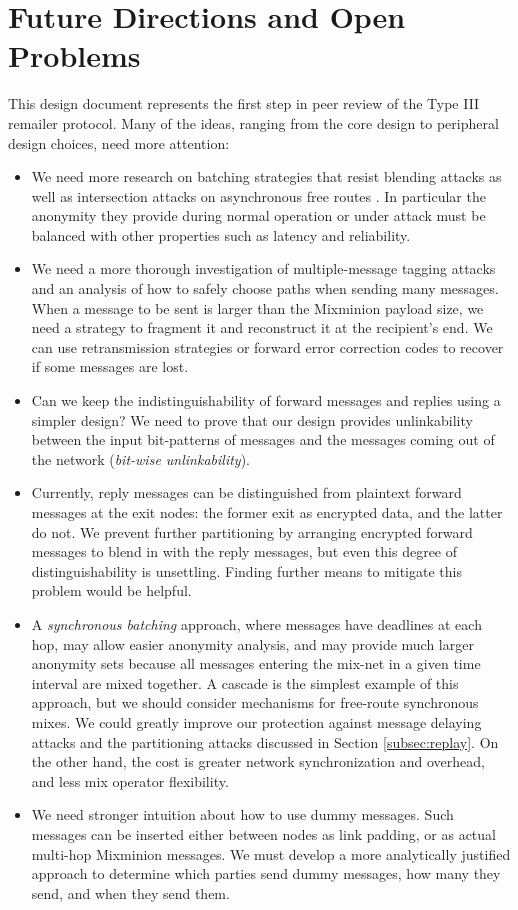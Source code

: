 \documentclass[final]{ieee}
\begin{document}

\section{Future Directions and Open Problems}
\label{sec:conclusion}

This design document represents the first step in peer review of the
Type III remailer protocol. Many of the ideas, ranging from the core
design to peripheral design choices, need more attention:

\begin{itemize}
\item We need more research on batching strategies that resist blending
attacks \cite{trickle02} as well as intersection
attacks on asynchronous free routes \cite{disad-free-routes}. In
particular the anonymity they provide during normal operation or
under attack must be balanced with other properties such as latency
and reliability.
\item We need a more thorough investigation of multiple-message tagging
attacks and an analysis of how to safely choose paths when
sending many messages. When a message to be sent is larger than the
Mixminion payload size, we need a strategy to fragment
it and reconstruct it at the recipient's end. 
We can use retransmission strategies or forward error
correction codes to recover if some messages are lost.
\item Can we keep the indistinguishability of forward messages and
replies using a simpler design? We need to prove that our design provides
unlinkability between the input bit-patterns of messages and the messages
coming out of the network (\emph{bit-wise unlinkability}).
\item Currently, reply messages can be distinguished from plaintext forward
messages at the exit nodes: the former exit as encrypted data, and the
latter do not.  We prevent further partitioning by arranging 
encrypted forward messages to blend in with the reply messages, but even this
degree of distinguishability is unsettling.  Finding further means to
mitigate this problem would be helpful.
\item A \emph{synchronous batching} approach, where messages have
deadlines at each hop, may allow easier anonymity analysis, and may
provide much larger anonymity sets because all messages entering the
mix-net in a given time interval are mixed together. A cascade is the
simplest example of this approach, but we should consider mechanisms for
free-route synchronous mixes. We could greatly improve our protection
against message delaying attacks and the partitioning attacks discussed
in Section \ref{subsec:replay}. On the other hand, the cost is greater
network synchronization and overhead, and less mix operator flexibility.
\item We need stronger intuition about how to use dummy messages. Such
messages can be inserted either between nodes as link padding, or as
actual multi-hop Mixminion messages. We must develop a more analytically
justified approach to determine which parties send dummy messages, how many
they send, and when they send them.


\end{itemize}
\end{document}
